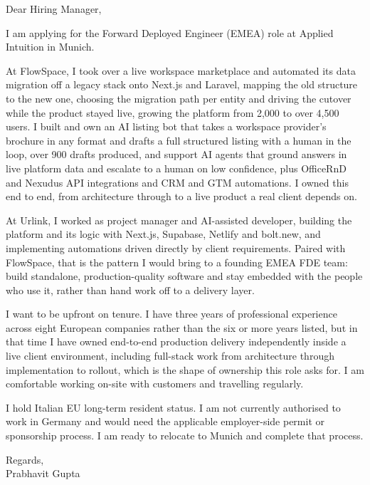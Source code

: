 \documentclass[a4paper,11pt]{article}
\begin{document}
Dear Hiring Manager,

I am applying for the Forward Deployed Engineer (EMEA) role at Applied Intuition in Munich.

At FlowSpace, I took over a live workspace marketplace and automated its data migration off a legacy stack onto Next.js and Laravel, mapping the old structure to the new one, choosing the migration path per entity and driving the cutover while the product stayed live, growing the platform from 2,000 to over 4,500 users. I built and own an AI listing bot that takes a workspace provider's brochure in any format and drafts a full structured listing with a human in the loop, over 900 drafts produced, and support AI agents that ground answers in live platform data and escalate to a human on low confidence, plus OfficeRnD and Nexudus API integrations and CRM and GTM automations. I owned this end to end, from architecture through to a live product a real client depends on.

At Urlink, I worked as project manager and AI-assisted developer, building the platform and its logic with Next.js, Supabase, Netlify and bolt.new, and implementing automations driven directly by client requirements. Paired with FlowSpace, that is the pattern I would bring to a founding EMEA FDE team: build standalone, production-quality software and stay embedded with the people who use it, rather than hand work off to a delivery layer.

I want to be upfront on tenure. I have three years of professional experience across eight European companies rather than the six or more years listed, but in that time I have owned end-to-end production delivery independently inside a live client environment, including full-stack work from architecture through implementation to rollout, which is the shape of ownership this role asks for. I am comfortable working on-site with customers and travelling regularly.

I hold Italian EU long-term resident status. I am not currently authorised to work in Germany and would need the applicable employer-side permit or sponsorship process. I am ready to relocate to Munich and complete that process.

Regards,\\
Prabhavit Gupta
\end{document}
